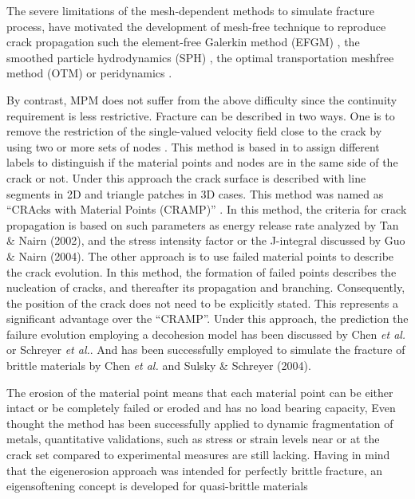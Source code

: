 \message{ !name(2020_EFM_MPM_Eigensoftening.tex)}\documentclass[preprint,12pt,a4paper]{elsarticle}
\begin{document}
The severe
limitations of the mesh-dependent methods to simulate fracture
process, have motivated the development of mesh-free technique to
reproduce crack propagation such the element-free Galerkin method
(EFGM) \cite{BELYTSCHKO_1995,BELYTSCHKO_2000,Zhuang_2012,Muthu_2013},
the smoothed particle hydrodynamics (SPH) \cite{Wang_2020,Wang_2019},
the optimal transportation meshfree method (OTM)
\cite{Li2010,Li_2012,Pandolfi_2013,Li_2015} or peridynamics
\cite{HA_2011,RABCZUK_2017}. 

By contrast, MPM does not suffer from the above difficulty since the
continuity requirement is less restrictive. Fracture can be described
in two ways. One is to remove the restriction of the single-valued
velocity field close to the crack by using two or more sets of nodes
\cite{Nairn_2006}. This method is based in to assign different labels
to distinguish if the material points and nodes are in the same side
of the crack or not. Under this approach the crack surface is
described with line segments in 2D and triangle patches in 3D
cases. This method was named as ``CRAcks with Material Points
(CRAMP)'' \cite{Nairn_2003}. In this method, the criteria for crack
propagation is based on such parameters as energy release rate
analyzed by Tan \& Nairn (2002)\cite{Nairn_2002}, and the stress
intensity factor or the J-integral discussed by Guo \& Nairn
(2004)\cite{Nairn_2004}. The other approach is to use failed material
points to describe the crack evolution. In this method, the formation
of failed points describes the nucleation of cracks, and thereafter its propagation and
branching. Consequently, the position of the crack does not need to be
explicitly stated. This represents a significant advantage over the
``CRAMP''. Under this approach, the prediction the failure evolution
employing a decohesion model has been discussed by Chen {\it et al.}\cite{Zhenmao_2005} or
Schreyer {\it et al.}\cite{Schreyer_2002}. And has been successfully
employed to simulate the fracture of brittle materials by Chen {\it et
  al.} \cite{Chen_2002,Chen_2003} and Sulsky \& Schreyer
(2004)\nocite{Sulsky_2004}.


\cite{Belytschko_04,Schmidt_2009,Pandolfi_2012}


The erosion of the material point means that each material point can
be either intact or be completely failed or eroded and has no load
bearing capacity, Even thought the method has been successfully
applied to dynamic fragmentation of metals, quantitative validations,
such as stress or strain levels near or at the crack set compared to
experimental measures are still lacking. Having in mind that the
eigenerosion approach was intended for perfectly brittle fracture, an
eigensoftening concept is developed for quasi-brittle materials
\end{document}
